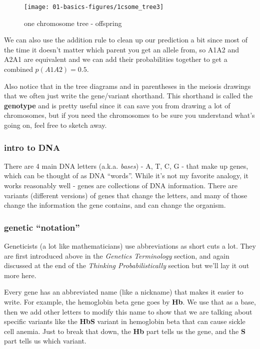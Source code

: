 \documentclass[]{book}
\theoremstyle{definition}
\theoremstyle{definition}
\theoremstyle{definition}
\theoremstyle{remark}
\begin{document}
\begin{figure}

{\centering \texttt{[image: 01-basics-figures/1csome\_tree3]} 

}

\caption{one chromosome tree - offspring}\label{fig:gen-fig-156}
\end{figure}

We can also use the addition rule to clean up our prediction a bit since
most of the time it doesn't matter which parent you get an allele from,
so A1A2 and A2A1 are equivalent and we can add their probabilities
together to get a combined \(p(A1A2)=0.5\).

Also notice that in the tree diagrams and in parentheses in the meiosis
drawings that we often just write the gene/variant shorthand. This
shorthand is called the \textbf{genotype} and is pretty useful since it
can save you from drawing a lot of chromosomes, but if you need the
chromosomes to be sure you understand what's going on, feel free to
sketch away.

\subsubsection{intro to DNA}\label{intro-to-dna}

There are 4 main DNA letters (a.k.a. \emph{bases}) - A, T, C, G - that
make up genes, which can be thought of as DNA ``words''. While it's not
my favorite analogy, it works reasonably well - genes are collections of
DNA information. There are variants (different versions) of genes that
change the letters, and many of those change the information the gene
contains, and can change the organism.

\subsubsection{\texorpdfstring{genetic
``notation''}{genetic notation}}\label{genetic-notation}

Geneticists (a lot like mathematicians) use abbreviations as short cuts
a lot. They are first introduced above in the \emph{Genetics
Terminology} section, and again discussed at the end of the
\emph{Thinking Probabilistically} section but we'll lay it out more
here.

Every gene has an abbreviated name (like a nickname) that makes it
easier to write. For example, the hemoglobin beta gene goes by
\textbf{Hb}. We use that as a base, then we add other letters to modify
this name to show that we are talking about specific variants like the
\textbf{HbS} variant in hemoglobin beta that can cause sickle cell
anemia. Just to break that down, the \textbf{Hb} part tells us the gene,
and the \textbf{S} part tells us which variant.
\end{document}

